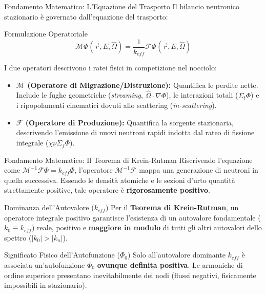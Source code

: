\documentclass[aspectratio=169]{beamer} %
\begin{document}
\begin{frame}
    
\end{frame}

\begin{frame}{Fondamento Matematico: L'Equazione del Trasporto}
Il bilancio neutronico stazionario è governato dall'equazione del trasporto:

\begin{alertblock}{Formulazione Operatoriale}
\begin{equation*}
\mathcal{M} \Phi(\vec{r}, E, \hat{\Omega}) = \frac{1}{k_{eff}} \mathcal{F} \Phi(\vec{r}, E, \hat{\Omega})
 \end{equation*}
\end{alertblock}

I due operatori descrivono i ratei fisici in competizione nel nocciolo:

\begin{itemize}
\item \textbf{$\mathcal{M}$ (Operatore di Migrazione/Distruzione):} Quantifica le perdite nette. Include le fughe geometriche (\textit{streaming}, $\hat{\Omega} \cdot \nabla \Phi$), le interazioni totali ($\Sigma_t \Phi$) e i ripopolamenti cinematici dovuti allo scattering (\textit{in-scattering}).
\item \textbf{$\mathcal{F}$ (Operatore di Produzione):} Quantifica la sorgente stazionaria, descrivendo l'emissione di nuovi neutroni rapidi indotta dal rateo di fissione integrale ($\chi \nu \Sigma_f \Phi$).
\end{itemize}
\end{frame}

\begin{frame}{Fondamento Matematico: Il Teorema di Krein-Rutman}
Riscrivendo l'equazione come $\mathcal{M}^{-1}\mathcal{F} \Phi = k_{eff} \Phi$, l'operatore $\mathcal{M}^{-1}\mathcal{F}$ mappa una generazione di neutroni in quella successiva. Essendo le densità atomiche e le sezioni d'urto quantità strettamente positive, tale operatore è \textbf{rigorosamente positivo}.

\begin{block}{Dominanza dell'Autovalore ($k_{eff}$)}
Per il \textbf{Teorema di Krein-Rutman}, un operatore integrale positivo garantisce l'esistenza di un autovalore fondamentale ($k_0 \equiv k_{eff}$) reale, positivo e \textbf{maggiore in modulo} di tutti gli altri autovalori dello spettro ($|k_0| > |k_n|$).
\end{block}

\begin{alertblock}{Significato Fisico dell'Autofunzione ($\Phi_0$)}
Solo all'autovalore dominante $k_{eff}$ è associata un'autofunzione $\Phi_0$ \textbf{ovunque definita positiva}. Le armoniche di ordine superiore presentano inevitabilmente dei nodi (flussi negativi, fisicamente impossibili in stazionario).
\end{alertblock}
\end{frame}
\end{document}
